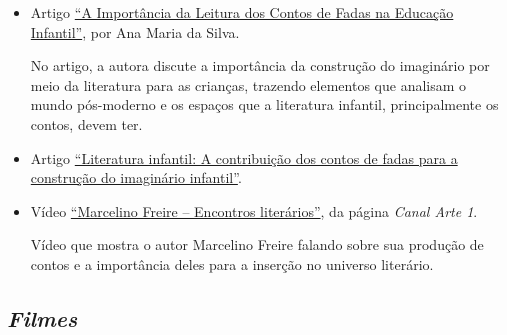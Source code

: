 \documentclass[11pt]{extarticle}
\begin{document}
\begin{itemize}
\item Artigo \href{https://siteantigo.portaleducacao.com.br/conteudo/artigos/educacao/a-importancia-da-leitura-dos-contos-de-fadas-na-educacao-infantil/30151}{``A Importância da Leitura dos Contos de Fadas na Educação Infantil''}, por Ana Maria da Silva. 

No artigo, a autora discute a importância da construção do imaginário por meio da literatura para as crianças, trazendo elementos que analisam o mundo pós-moderno e os espaços que a literatura infantil, principalmente os contos, devem ter.

\item Artigo \href{http://docs.uninove.br/arte/fac/publicacoes/pdf/v3-n1-2012/Francy.pdf}{``Literatura infantil: A contribuição dos contos de fadas para a construção do imaginário infantil''}. 

\item Vídeo \href{https://www.youtube.com/watch?v=kqUU9f6dX8E}{“Marcelino Freire -- Encontros literários”}, da página \textit{Canal Arte 1}. 

Vídeo que mostra o autor Marcelino Freire falando sobre sua produção de contos e a importância deles para a inserção no universo literário.
\end{itemize}

\subsection{\textit{Filmes}}
\end{document}
